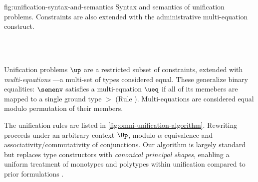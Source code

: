 \documentclass[acmsmall,screen,nonacm,review]{acmart}
\begin{document}
\begin{mathparfig}[htpb!]
  {fig:unification-syntax-and-semantics}
  {Syntax and semantics of unification problems. Constraints are also extended with the
  administrative multi-equation construct.}
\begin{minipage}[t]{0.45\textwidth}
\begin{bnfgrammar}
   \\
   \\
  \entry[Constraints]{\c}{
    \dots \and \ueq
  }
\end{bnfgrammar}
\end{minipage}
\hspace{0.3\textwidth}
\begin{minipage}[t]{0.45\textwidth}
    {\semenv \th \ueq}
\end{minipage}
\end{mathparfig}


Unification problems $\up$ are a restricted subset of constraints, extended
with \emph{multi-equations} \citep{Pottier-Remy/emlti}---a multi-set of types
considered equal. These generalize binary equalities: $\semenv$ satisfies a
multi-equation $\ueq$ if all of its memebers are mapped to a single ground type
$\gt$ (Rule ). Multi-equations are considered equal modulo
permutation of their members.


The unification rules are listed in \cref{fig:omni-unification-algorithm}.
Rewriting proceeds under an arbitrary context $\Up$, modulo $\alpha$-equivalence
and associativity/commutativity of conjunctions.
%
Our algorithm is largely standard \cite{Pottier-Remy/emlti} but replaces type
constructors with \emph{canonical principal shapes}, enabling a uniform
treatment of monotypes and polytypes within unification compared to
prior formulations \citep{Garrigue-Remy/poly-ml}.
\end{document}
